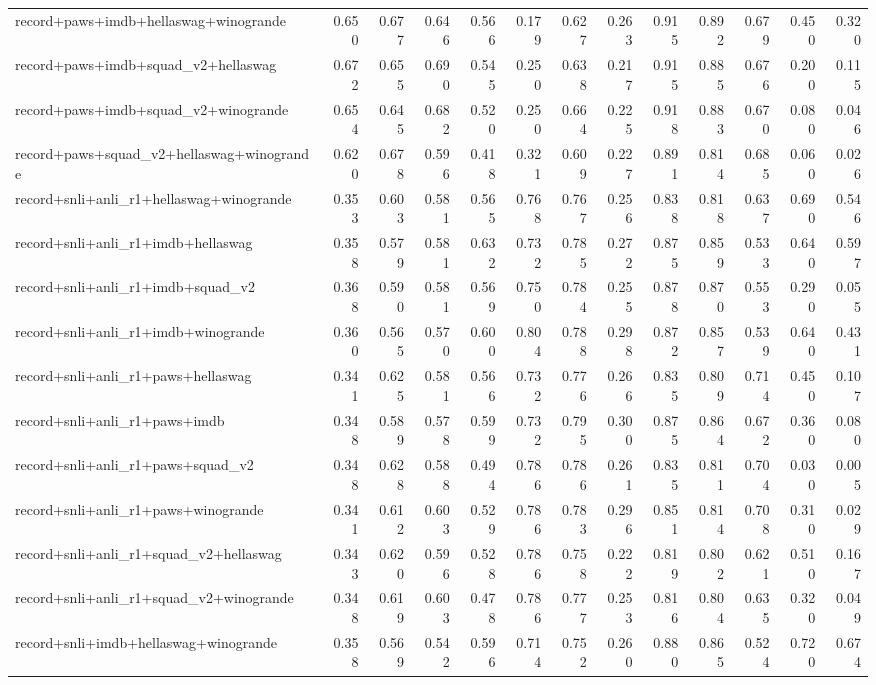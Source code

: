 \begin{table}[t]
\begin{tabular}{lrrrrrrrrrrrr}
    record+paws+imdb+hellaswag+winogrande & 0.650 & 0.677 & 0.646 & 0.566 & 0.179 & 0.627 & 0.263 & 0.915 & 0.892 & 0.679 & 0.450 & 0.320 \\
    record+paws+imdb+squad\_v2+hellaswag & 0.672 & 0.655 & 0.690 & 0.545 & 0.250 & 0.638 & 0.217 & 0.915 & 0.885 & 0.676 & 0.200 & 0.115 \\
    record+paws+imdb+squad\_v2+winogrande & 0.654 & 0.645 & 0.682 & 0.520 & 0.250 & 0.664 & 0.225 & 0.918 & 0.883 & 0.670 & 0.080 & 0.046 \\
    record+paws+squad\_v2+hellaswag+winogrande & 0.620 & 0.678 & 0.596 & 0.418 & 0.321 & 0.609 & 0.227 & 0.891 & 0.814 & 0.685 & 0.060 & 0.026 \\
    record+snli+anli\_r1+hellaswag+winogrande & 0.353 & 0.603 & 0.581 & 0.565 & 0.768 & 0.767 & 0.256 & 0.838 & 0.818 & 0.637 & 0.690 & 0.546 \\
    record+snli+anli\_r1+imdb+hellaswag & 0.358 & 0.579 & 0.581 & 0.632 & 0.732 & 0.785 & 0.272 & 0.875 & 0.859 & 0.533 & 0.640 & 0.597 \\
    record+snli+anli\_r1+imdb+squad\_v2 & 0.368 & 0.590 & 0.581 & 0.569 & 0.750 & 0.784 & 0.255 & 0.878 & 0.870 & 0.553 & 0.290 & 0.055 \\
    record+snli+anli\_r1+imdb+winogrande & 0.360 & 0.565 & 0.570 & 0.600 & 0.804 & 0.788 & 0.298 & 0.872 & 0.857 & 0.539 & 0.640 & 0.431 \\
    record+snli+anli\_r1+paws+hellaswag & 0.341 & 0.625 & 0.581 & 0.566 & 0.732 & 0.776 & 0.266 & 0.835 & 0.809 & 0.714 & 0.450 & 0.107 \\
    record+snli+anli\_r1+paws+imdb & 0.348 & 0.589 & 0.578 & 0.599 & 0.732 & 0.795 & 0.300 & 0.875 & 0.864 & 0.672 & 0.360 & 0.080 \\
    record+snli+anli\_r1+paws+squad\_v2 & 0.348 & 0.628 & 0.588 & 0.494 & 0.786 & 0.786 & 0.261 & 0.835 & 0.811 & 0.704 & 0.030 & 0.005 \\
    record+snli+anli\_r1+paws+winogrande & 0.341 & 0.612 & 0.603 & 0.529 & 0.786 & 0.783 & 0.296 & 0.851 & 0.814 & 0.708 & 0.310 & 0.029 \\
    record+snli+anli\_r1+squad\_v2+hellaswag & 0.343 & 0.620 & 0.596 & 0.528 & 0.786 & 0.758 & 0.222 & 0.819 & 0.802 & 0.621 & 0.510 & 0.167 \\
    record+snli+anli\_r1+squad\_v2+winogrande & 0.348 & 0.619 & 0.603 & 0.478 & 0.786 & 0.777 & 0.253 & 0.816 & 0.804 & 0.635 & 0.320 & 0.049 \\
    record+snli+imdb+hellaswag+winogrande & 0.358 & 0.569 & 0.542 & 0.596 & 0.714 & 0.752 & 0.260 & 0.880 & 0.865 & 0.524 & 0.720 & 0.674 \\

\end{tabular}
\end{table}
